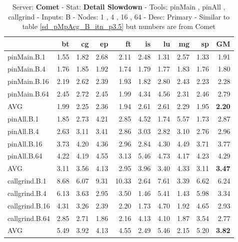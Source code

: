\begin{table*}[]
\caption{Server: \textbf{Comet} - 
 Stat: \textbf{Detail Slowdown} -
 Tools: pinMain , pinAll , callgrind -  
 Inputs: B -
 Nodes: 1 , 4 , 16 , 64 -
 Desc: Primary  - Similar to table \ref{sd_pMpAcg_B_itn_p3.5} but numbers are from Comet}
\label{comet_sd_pMpAcg_B_itn_p3.5}
\begin{center}
\begin{tabular}{|l|rrrrrrrr|r|}
\hline
                &   bt &   cg &   ep &    ft &   is &   lu &   mg &   sp &   GM \\
\hline
 pinMain.B.1    & 1.55 & 1.82 & 2.68 &  2.11 & 2.48 & 1.31 & 2.57 & 1.33 & 1.91 \\
 pinMain.B.4    & 1.76 & 1.85 & 1.92 &  1.74 & 1.79 & 1.77 & 1.83 & 1.76 & 1.80 \\
 pinMain.B.16   & 2.19 & 2.62 & 2.39 &  1.93 & 1.82 & 2.80 & 2.43 & 2.23 & 2.28 \\
 pinMain.B.64   & 2.45 & 2.72 & 2.45 &  1.99 & 4.34 & 4.56 & 2.31 & 2.46 & 2.79 \\
 \hline
 AVG            & 1.99 & 2.25 & 2.36 &  1.94 & 2.61 & 2.61 & 2.29 & 1.95 & \textbf{2.20} \\
 \hline
 pinAll.B.1     & 1.85 & 2.73 & 4.21 &  2.85 & 4.52 & 1.74 & 5.57 & 1.73 & 2.87 \\
 pinAll.B.4     & 2.63 & 3.11 & 3.41 &  2.86 & 3.03 & 2.82 & 3.10 & 2.76 & 2.96 \\
 pinAll.B.16    & 3.73 & 4.20 & 4.36 &  2.96 & 2.84 & 4.30 & 4.49 & 3.71 & 3.77 \\
 pinAll.B.64    & 4.22 & 4.19 & 4.55 &  3.13 & 5.46 & 4.73 & 4.17 & 4.23 & 4.29 \\
 \hline
 AVG            & 3.11 & 3.56 & 4.13 &  2.95 & 3.96 & 3.40 & 4.33 & 3.11 & \textbf{3.47} \\
 \hline
 callgrind.B.1  & 8.68 & 6.07 & 9.31 & 10.33 & 2.64 & 7.61 & 3.39 & 6.62 & 6.24 \\
 callgrind.B.4  & 6.13 & 3.63 & 2.95 &  3.50 & 1.46 & 5.41 & 1.43 & 5.98 & 3.34 \\
 callgrind.B.16 & 4.31 & 3.26 & 2.39 &  2.20 & 1.73 & 4.70 & 1.92 & 4.65 & 2.93 \\
 callgrind.B.64 & 2.85 & 2.71 & 1.86 &  2.16 & 4.13 & 4.10 & 1.87 & 3.54 & 2.77 \\
 \hline
 AVG            & 5.49 & 3.92 & 4.13 &  4.55 & 2.49 & 5.46 & 2.15 & 5.20 & \textbf{3.82} \\
\hline
\end{tabular}
\end{center}
\end{table*}
